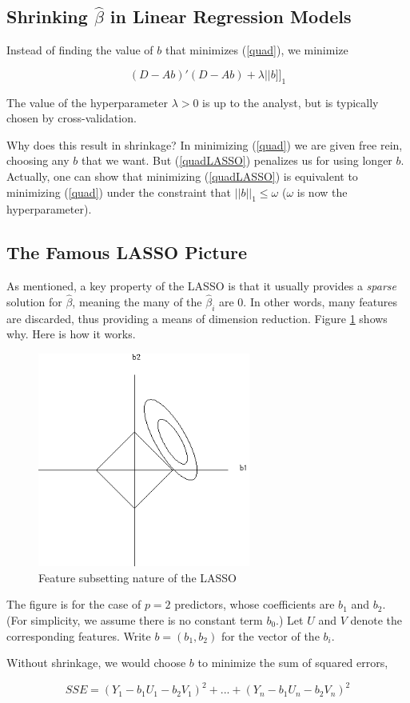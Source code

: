 \subsection{Shrinking $\widehat{\beta}$ in Linear Regression Models}

Instead of finding the value of $b$ that minimizes (\ref{quad}), we
minimize

\begin{equation}
\label{quadLASSO}
(D - Ab)'(D - Ab) + \lambda ||b]]_{1}
\end{equation}

The value of the hyperparameter $\lambda > 0$ is up to the analyst, but
is typically chosen by cross-validation.

Why does this result in shrinkage?  In minimizing (\ref{quad}) we are
given free rein, choosing any $b$ that we want.  But (\ref{quadLASSO})
penalizes us for using longer $b$.  Actually, one can show that
minimizing (\ref{quadLASSO}) is equivalent to minimizing (\ref{quad})
under the constraint that $||b||_{1} \leq \omega$ ($\omega$ is now the
hyperparameter).

\subsection{The Famous LASSO Picture}

As mentioned, a key property of the LASSO is that it usually provides a
\textit{sparse} solution for $\widehat{\beta}$, meaning the many of the
$\widehat{\beta}_i$ are 0.  In other words, many features are discarded,
thus providing a means of dimension reduction.  Figure \ref{lassosub}
shows why.  Here is how it works.

\begin{figure}
\vskip 0.2in
\centerline{
\includegraphics[width=2.75in]{Images/LASSO_gray.png}
}
\caption{Feature subsetting nature of the LASSO}
\label{lassosub}
\end{figure}

The figure is for the case of $p = 2$ predictors, whose coefficients are
$b_1$ and $b_2$.  (For simplicity, we assume there is no constant term
$b_0$.)  Let $U$ and $V$ denote the corresponding features.
Write $b = (b_1,b_2)$ for the vector of the $b_i$.

Without shrinkage, we would choose $b$ to minimize the sum of squared
errors,

\begin{equation}
SSE = (Y_1 - b_1 U_1 - b_2 V_1)^2 + ... +
(Y_n - b_1 U_n - b_2 V_n)^2
\end{equation}

